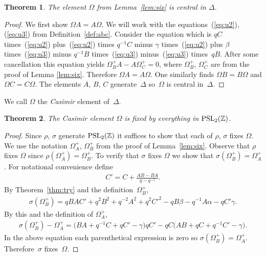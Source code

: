 \documentclass[pdftex]{sigma}
\numberwithin{equation}{section}
\newtheorem{Theorem}{Theorem}[section]
\begin{document}
\begin{Theorem}
\label{lem:center}
The element $\Omega$ from
Lemma~{\rm \ref{lem:six}} is central in $\Delta $.
\end{Theorem}

\begin{proof}
We f\/irst show $\Omega A = A \Omega $.
We will work with the equations~(\ref{eq:u2}),
(\ref{eq:u3}) from Def\/inition~\ref{def:abc}. Consider the equation which is
$qC $ times~(\ref{eq:u2}) plus~(\ref{eq:u2}) times $q^{-1}C$
minus $\gamma$ times~(\ref{eq:u2})
plus $\beta$ times~(\ref{eq:u3})
minus
$q^{-1}B$ times~(\ref{eq:u3})
minus~(\ref{eq:u3}) times~$qB$.
After some cancellation this equation yields
$\Omega^+_B A- A\Omega^+_C =0$, where
$\Omega^+_B$, $\Omega^+_C$
are from the proof of Lemma
\ref{lem:six}.
Therefore
$\Omega A= A\Omega $.
 One similarly
f\/inds
$
\Omega B = B \Omega$ and
$
\Omega C = C \Omega$.
The elements $A$, $B$, $C$ generate~$\Delta $ so~$\Omega$ is central in~$\Delta$.
\end{proof}

\begin{Definition}
We call $\Omega$ the {\it Casimir} element
of~$\Delta $.
\end{Definition}

\begin{Theorem}
The Casimir element $\Omega$ is fixed by everything
in ${\rm  {PSL}}_2(\mathbb Z)$.
\end{Theorem}

\begin{proof}
Since $\rho$, $\sigma$ generate
${\rm  {PSL}}_2(\mathbb Z)$ it suf\/f\/ices to show
that each of $\rho$, $\sigma$ f\/ixes $\Omega$.
We use the notation $\Omega^+_A$, $\Omega^+_B$
from the proof of Lemma~\ref{lem:six}.
Observe that $\rho$ f\/ixes $\Omega$ since
$\rho(\Omega^+_A)=\Omega^+_B$.
To verify that  $\sigma$ f\/ixes $\Omega$ we show
that $\sigma(\Omega^+_B)=\Omega^+_A$.
For notational convenience def\/ine
\begin{gather*}
C' = C + \frac{AB-BA}{q-q^{-1}}.
\end{gather*}
By Theorem~\ref{thm:try} and the def\/inition~$\Omega^+_B$,
\begin{gather*}
\sigma(\Omega^+_B) =
qBAC' + q^2B^2+q^{-2}A^2+q^2C'^2-q B\beta-q^{-1}A \alpha -q C' \gamma .
\end{gather*}
By this and the def\/inition of $\Omega^+_A$,
\begin{gather*}
\sigma(\Omega^+_B)-\Omega^+_A
=
\big(BA+q^{-1}C+qC'-\gamma\big)qC'
 - qC\big(AB+qC+q^{-1}C'-\gamma\big).
\end{gather*}
In the above equation each parenthetical expression
is zero
so
$\sigma(\Omega^+_B)=\Omega^+_A$.
Therefore~$\sigma$ f\/ixes~$\Omega$.
\end{proof}
\end{document}
